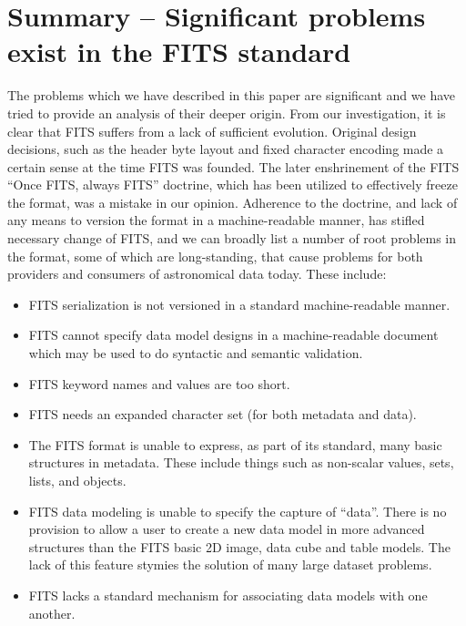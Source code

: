 \documentclass[final,authoryear,5p,times,twocolumn]{elsarticle}
\begin{document}
{{\section{Summary -- Significant problems exist in the FITS standard}


The problems which we have described in this paper are significant
and we have tried to provide an analysis of their deeper origin.
From our investigation, it is clear that FITS suffers from a lack of
sufficient evolution. Original design decisions, such as the header
byte layout and fixed character encoding made a certain sense at the
time FITS was founded. The later enshrinement of the FITS ``Once FITS, always
FITS'' doctrine, which has
been utilized to effectively freeze the format, was a mistake in our
opinion.  Adherence to the doctrine, and lack of any means to version
the format in a machine-readable manner, has stifled necessary change of
FITS, and we can broadly list a number of root problems in the format,
some of which are long-standing, that cause problems for both providers
and consumers of astronomical data today.  These include:

\begin{itemize}

\item FITS serialization is not versioned in a standard machine-readable manner.

\item FITS cannot specify data model designs in a machine-readable document
which may be used to do syntactic and semantic validation.

\item FITS keyword names and values are too short.

\item FITS needs an expanded character set (for both metadata and data).

\item The FITS format is unable to express, as part of its standard,
many basic structures in metadata. These include things such as non-scalar
values, sets, lists, and objects.

\item FITS data modeling is unable to specify the capture of ``data''.
There is no provision to allow a user to create a new data model in more
advanced structures than the FITS basic 2D image, data cube and table models.
The lack of this feature stymies the solution of many large dataset problems.

\item FITS lacks a standard mechanism for associating data models with one another.


\end{itemize}}}
\end{document}
